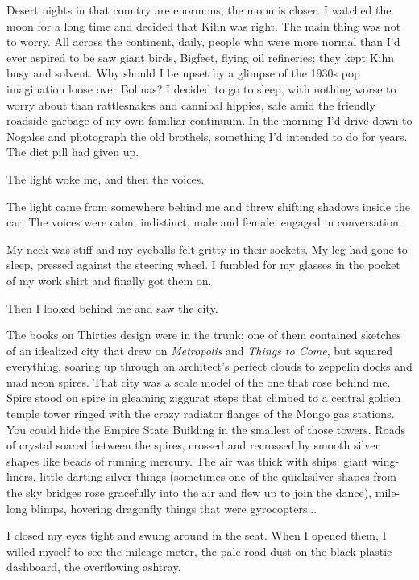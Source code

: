 Desert nights in that country are enormous; the moon is closer. I watched the moon for a long time and decided that Kihn was right. The main thing was not to worry. All across the continent, daily, people who were more normal than I'd ever aspired to be saw giant birds, Bigfeet, flying oil refineries; they kept Kihn busy and solvent. Why should I be upset by a glimpse of the 1930s pop imagination loose over Bolinas? I decided to go to sleep, with nothing worse to worry about than rattlesnakes and cannibal hippies, safe amid the friendly roadside garbage of my own familiar continuum. In the morning I'd drive down to Nogales and photograph the old brothels, something I'd intended to do for years. The diet pill had given up.

The light woke me, and then the voices.

The light came from somewhere behind me and threw shifting shadows inside the car. The voices were calm, indistinct, male and female, engaged in conversation.

My neck was stiff and my eyeballs felt gritty in their sockets. My leg had gone to sleep, pressed against the steering wheel. I fumbled for my glasses in the pocket of my work shirt and finally got them on.

Then I looked behind me and saw the city.

The books on Thirties design were in the trunk; one of them contained sketches of an idealized city that drew on \textit{Metropolis} and \textit{Things to Come}, but squared everything, soaring up through an architect's perfect clouds to zeppelin docks and mad neon spires. That city was a scale model of the one that rose behind me. Spire stood on spire in gleaming ziggurat steps that climbed to a central golden temple tower ringed with the crazy radiator flanges of the Mongo gas stations. You could hide the Empire State Building in the smallest of those towers. Roads of crystal soared between the spires, crossed and recrossed by smooth silver shapes like beads of running mercury. The air was thick with ships: giant wing-liners, little darting silver things (sometimes one of the quicksilver shapes from the sky bridges rose gracefully into the air and flew up to join the dance), mile-long blimps, hovering dragonfly things that were gyrocopters...

I closed my eyes tight and swung around in the seat. When I opened them, I willed myself to see the mileage meter, the pale road dust on the black plastic dashboard, the overflowing ashtray.


